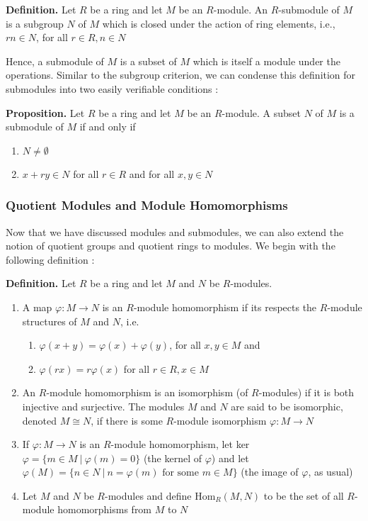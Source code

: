 \documentclass[11pt, reqno]{amsart}
\theoremstyle{plain}
\theoremstyle{definition}
\theoremstyle{example}
\def\Hom{\mathrm{Hom}}
\begin{document}
\par
\textbf{Definition.} Let $R$ be a ring and let $M$ be an $R$-module. An $R$-submodule of $M$ is a subgroup $N$ of $M$ which is closed under the action of ring elements, i.e., $rn \in N$, for all $r \in R, n \in N$

Hence, a submodule of $M$ is a subset of $M$ which is itself a module under the operations. Similar to the subgroup criterion, we can condense this definition for submodules into two easily verifiable conditions \cite[\S 10.1, p. 342]{dummit}:

\par
\textbf{Proposition.} Let $R$ be a ring and let $M$ be an $R$-module. A subset $N$ of $M$ is a submodule of $M$ if and only if
\begin{enumerate}
\item $N \neq \emptyset$
\item $x + ry \in N$ for all $r \in R$ and for all $x, y \in N$
\end{enumerate}

\subsubsection{Quotient Modules and Module Homomorphisms}

Now that we have discussed modules and submodules, we can also extend the notion of quotient groups and quotient rings to modules. We begin with the following definition \cite[\S 10.2, p. 345]{dummit}:

\par
\textbf{Definition.} Let $R$ be a ring and let $M$ and $N$ be $R$-modules.
\begin{enumerate}
\item A map $\varphi: M \to N$ is an $R$-module homomorphism if its respects the $R$-module structures of $M$ and $N$, i.e.
\begin{enumerate}[label=\alph*)]
\item $\varphi(x + y) = \varphi(x) + \varphi(y)$, for all $x, y \in M$ and
\item $\varphi(rx) = r\varphi(x)$ for all $r \in R, x \in M$
\end{enumerate}

\item An $R$-module homomorphism is an isomorphism (of $R$-modules) if it is both injective and surjective. The modules $M$ and $N$ are said to be isomorphic, denoted $M \cong N$, if there is some $R$-module isomorphism $\varphi: M \to N$
\item If $\varphi: M \to N$ is an $R$-module homomorphism, let ker $\varphi = \{m \in M \ | \ \varphi(m) = 0\}$ (the kernel of $\varphi$) and let $\varphi(M) = \{n \in N \ | \ n = \varphi(m) \text{ for some } m \in M\}$ (the image of $\varphi$, as usual)

\item Let $M$ and $N$ be $R$-modules and define $\Hom_R(M,N)$ to be the set of all $R$-module homomorphisms from $M$ to $N$
\end{enumerate}
\end{document}
